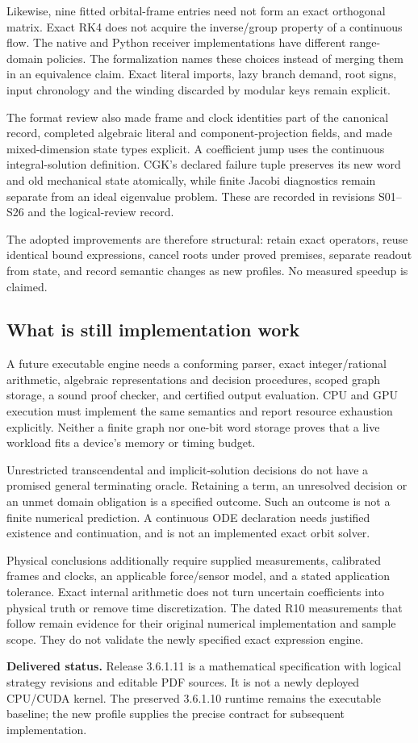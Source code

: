 Likewise, nine fitted orbital-frame entries need not form an exact orthogonal
matrix. Exact RK4 does not acquire the inverse/group property of a continuous
flow. The native and Python receiver implementations have different range-domain
policies. The formalization names these choices instead of merging them in an
equivalence claim. Exact literal imports, lazy branch demand, root signs, input
chronology and the winding discarded by modular keys remain explicit.

The format review also made frame and clock identities part of the canonical
record, completed algebraic literal and component-projection fields, and made
mixed-dimension state types explicit. A coefficient jump uses the continuous
integral-solution definition. CGK's declared failure tuple preserves its new
word and old mechanical state atomically, while finite Jacobi diagnostics remain
separate from an ideal eigenvalue problem. These are recorded in revisions
S01--S26 and the logical-review record.

The adopted improvements are therefore structural: retain exact operators,
reuse identical bound expressions, cancel roots under proved premises, separate
readout from state, and record semantic changes as new profiles. No measured
speedup is claimed.

\subsection{What is still implementation work}
A future executable engine needs a conforming parser, exact integer/rational
arithmetic, algebraic representations and decision procedures, scoped graph
storage, a sound proof checker, and certified output evaluation. CPU and GPU
execution must implement the same semantics and report resource exhaustion
explicitly. Neither a finite graph nor one-bit word storage proves that a live
workload fits a device's memory or timing budget.

Unrestricted transcendental and implicit-solution decisions do not have a
promised general terminating oracle. Retaining a term, an unresolved decision
or an unmet domain obligation is a specified outcome. Such an outcome is not a
finite numerical prediction. A continuous ODE declaration needs justified
existence and continuation, and is not an implemented exact orbit solver.

Physical conclusions additionally require supplied measurements, calibrated
frames and clocks, an applicable force/sensor model, and a stated application
tolerance. Exact internal arithmetic does not turn uncertain coefficients into
physical truth or remove time discretization. The dated R10 measurements that
follow remain evidence for their original numerical implementation and sample
scope. They do not validate the newly specified exact expression engine.

\begin{panel}
\textbf{Delivered status.} Release 3.6.1.11 is a mathematical specification with
logical strategy revisions and editable PDF sources. It is not a newly deployed
CPU/CUDA kernel. The preserved 3.6.1.10 runtime remains the executable baseline;
the new profile supplies the precise contract for subsequent implementation.
\end{panel}
